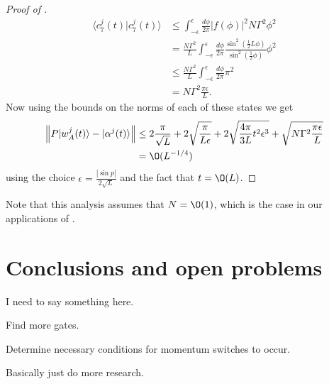 \documentclass[../thesis-main/thesis-main]{subfiles}
\begin{document}
\begin{proof}[Proof of {}]
\begin{align*}
\langle c_{7}^{j}(t)|c_{7}^{j}(t)\rangle & \leq \int_{-\epsilon}^{\epsilon}\frac{d\phi}{2\pi}\left|f(\phi)\right|^{2}N\Gamma^{2}\phi^{2}\\
 & = \frac{N\Gamma^{2}}{L}\int_{-\epsilon}^{\epsilon}\frac{d\phi}{2\pi}\frac{\sin^{2}(\frac{1}{2}L\phi)}{\sin^{2}(\frac{1}{2}\phi)}\phi^{2}\\
 & \leq \frac{N\Gamma^{2}}{L}\int_{-\epsilon}^{\epsilon}\frac{d\phi}{2\pi}\pi^{2}\\
 & = N\Gamma^{2}\frac{\pi\epsilon}{L}.
\end{align*}
Now using the bounds on the norms of each of these states we get
\begin{align*}
\left\Vert P|w_{A}^{j}(t)\rangle-|\alpha^{j}(t)\rangle\right\Vert  & \leq 2\frac{\pi}{\sqrt{L}}+2\sqrt{\frac{\pi}{L\epsilon}}+2\sqrt{\frac{4\pi}{3L}t^{2}\epsilon^{3}}+\sqrt{N\Gamma^{2}\frac{\pi\epsilon}{L}}\\
 & = \O(L^{-{1}/{4}})
\end{align*}
using the choice $\epsilon=\frac{|{\sin p}|}{2\sqrt{L}}$ and the fact that $t = \O(L)$. 
\end{proof}

Note that this analysis assumes that $N = \O(1)$, which is the case in our applications of .



\section{Conclusions and open problems}

I need to say something here.

Find more gates.

Determine necessary conditions for momentum switches to occur.

Basically just do more research.

\biblio{}
\end{document}
